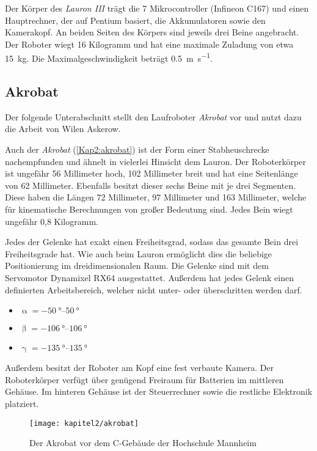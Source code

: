 Der Körper des \emph{Lauron III} trägt die 7 Mikrocontroller (Infineon C167) und einen Hauptrechner, der auf Pentium basiert, die Akkumulatoren sowie den Kamerakopf. An beiden Seiten des Körpers sind jeweils drei Beine angebracht. Der Roboter wiegt 16 Kilogramm und hat eine maximale Zuladung von etwa \SI{15}{\kilo\gram}. Die Maximalgeschwindigkeit beträgt \SI{0.5}{\metre\per\second}.

\subsection{Akrobat}

Der folgende Unterabschnitt stellt den Laufroboter \emph{Akrobat} vor und nutzt dazu die Arbeit von Wilen Askerow. \autocite{askerow2014}

Auch der \emph{Akrobat} (\autoref{Kap2:akrobat}) ist der Form einer Stabheuschrecke nachempfunden und ähnelt in vielerlei Hinsicht dem Lauron. Der Roboterkörper ist ungefähr 56 Millimeter hoch, 102 Millimeter breit und hat eine Seitenlänge von 62 Millimeter. Ebenfalls besitzt dieser sechs Beine mit je drei Segmenten. Diese haben die Längen 72 Millimeter, 97 Millimeter und 163 Millimeter, welche für kinematische Berechnungen von großer Bedeutung sind. Jedes Bein wiegt ungefähr 0,8 Kilogramm.

Jedes der Gelenke hat exakt einen Freiheitsgrad, sodass das gesamte Bein drei Freiheitsgrade hat. Wie auch beim Lauron ermöglicht dies die beliebige Positionierung im dreidimensionalen Raum. Die Gelenke sind mit dem Servomotor Dynamixel RX64 ausgestattet. Außerdem hat jedes Gelenk einen definierten Arbeitsbereich, welcher nicht unter- oder überschritten werden darf.
\begin{itemize}
  \item $\upalpha=\SIrange{-50}{50}{\degree}$
  \item $\upbeta=\SIrange{-106}{106}{\degree}$
  \item $\upgamma=\SIrange{-135}{135}{\degree}$
\end{itemize}  

Außerdem besitzt der Roboter am Kopf eine fest verbaute Kamera. Der Roboterkörper verfügt über genügend Freiraum für Batterien im mittleren Gehäuse. Im hinteren Gehäuse ist der Steuerrechner sowie die restliche Elektronik platziert.

\begin{figure}[b!]
  \centering
  \texttt{[image: kapitel2/akrobat]}
  \caption{Der Akrobat vor dem C-Gebäude der Hochschule Mannheim}
  \label{Kap2:akrobat}
\end{figure}


